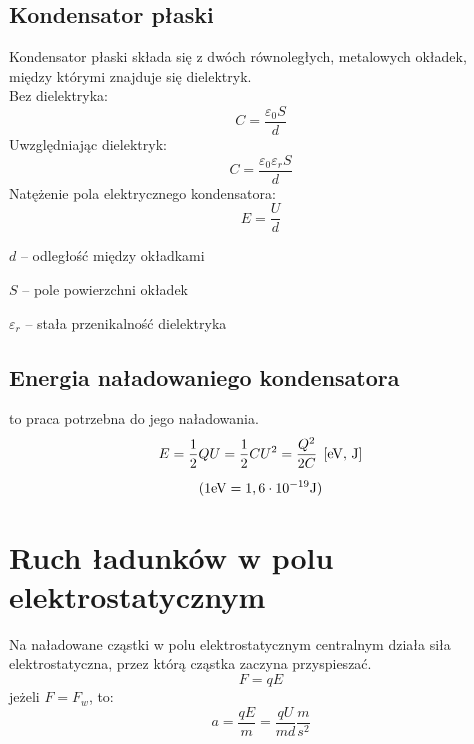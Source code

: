     \subsection{Kondensator płaski}
      \begin{definition}
        Kondensator płaski składa się z dwóch równoległych, metalowych okładek, między którymi znajduje się dielektryk.\\[1.5em]
        Bez dielektryka:
        \begin{equation*}
          C = \frac{\varepsilon_0S}{d} 
        \end{equation*}
        Uwzględniając dielektryk:
        \begin{equation*}
          C = \frac{\varepsilon_0\varepsilon_rS}{d}
        \end{equation*}
        Natężenie pola elektrycznego kondensatora:
        \begin{equation*}
          E = \frac{U}{d}
        \end{equation*}
        \begin{symbols}
          \item $d$ -- odległość między okładkami
          \item $S$ -- pole powierzchni okładek
          \item $\varepsilon_r$ -- stała przenikalność dielektryka
        \end{symbols}
      \end{definition}

    \subsection{Energia naładowaniego kondensatora}
      \begin{definition}
         to praca potrzebna do jego naładowania.
        \begin{gather*}
          E = \frac{1}{2}QU = \frac{1}{2}CU^2 = \frac{Q^2}{2C} \;\left[\mathrm{eV},\,\mathrm{J}\right]\\[0.5em]
          (1\mathrm{eV} = 1,6\cdot 10^{-19}\mathrm{J})
        \end{gather*}
      \end{definition}
  \section{Ruch ładunków w polu elektrostatycznym}
    Na naładowane cząstki w polu elektrostatycznym centralnym działa siła elektrostatyczna, przez którą cząstka zaczyna przyspieszać.
    \begin{equation*}
      F = qE
    \end{equation*}
    jeżeli $F = F_w$, to:
    \begin{equation*}
      a = \frac{qE}{m} = \frac{qU}{md} \unit{\frac{m}{s^2}}
    \end{equation*}
